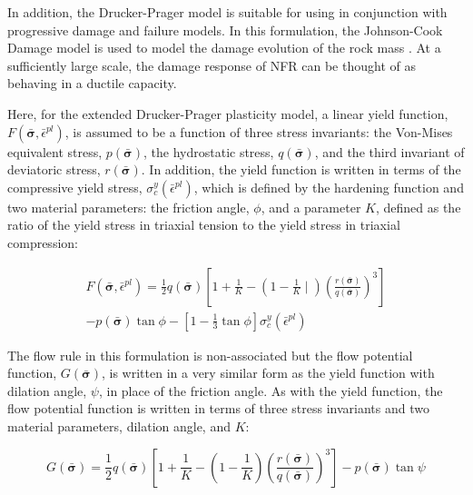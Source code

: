 In addition, the Drucker-Prager model is suitable for using in conjunction with progressive damage and failure models. In this formulation, the Johnson-Cook Damage model is used to model the damage evolution of the rock mass \citep{Johnson_1985}. At a sufficiently large scale, the damage response of NFR can be thought of as behaving in a ductile capacity. 

Here, for the extended Drucker-Prager plasticity model, a linear yield function, $F\left(\bar{\boldsymbol{\sigma}}, \bar{\epsilon}^{pl}\right)$, is assumed to be a function of three stress invariants: the Von-Mises equivalent stress, $p\left(\bar{\boldsymbol{\sigma}}\right)$, the hydrostatic stress, $q\left(\bar{\boldsymbol{\sigma}}\right)$, and the third invariant of deviatoric stress, $r\left(\bar{\boldsymbol{\sigma}}\right)$. In addition, the yield function is written in terms of the compressive yield stress, $\sigma_c^y\left(\bar{\epsilon}^{pl}\right)$, which is defined by the hardening function and two material parameters: the friction angle, $\phi$, and a parameter $K$, defined as the ratio of the yield stress in triaxial tension to the yield stress in triaxial compression:

\begin{multline}
F\left(\bar{\boldsymbol{\sigma}}, \bar{\epsilon}^{pl}\right)=
\frac{1}{2}q\left(\bar{\boldsymbol{\sigma}}\right)\left [ 1+\frac{1}{K}-\left ( 1-\frac{1}{K} \mid \right )\left ( \frac{r\left(\bar{\boldsymbol{\sigma}}\right)}{q\left(\bar{\boldsymbol{\sigma}}\right)} \right )^3 \right ] \\
- p\left(\bar{\boldsymbol{\sigma}}\right)\tan\phi - \left[1-\frac{1}{3}\tan\phi \right]\sigma_c^y\left(\bar{\epsilon}^{pl}\right)
\label{eqn:druc1}
\end{multline}

The flow rule in this formulation is non-associated but the flow potential function, $G\left(\bar{\boldsymbol{\sigma}}\right)$, is written in a very similar form as the yield function with dilation angle, $\psi$, in place of the friction angle. As with the yield function, the flow potential function is written in terms of three stress invariants and two material parameters, dilation angle, and $K$:

\begin{equation}
G\left(\bar{\boldsymbol{\sigma}}\right)=
\frac{1}{2}q\left(\bar{\boldsymbol{\sigma}}\right)\left [ 1+\frac{1}{K}-\left ( 1-\frac{1}{K} \right )\left ( \frac{r\left(\bar{\boldsymbol{\sigma}}\right)}{q\left(\bar{\boldsymbol{\sigma}}\right)} \right )^3 \right ] 
-p\left(\bar{\boldsymbol{\sigma}}\right)\tan\psi
\label{eqn:druc2}
\end{equation}

